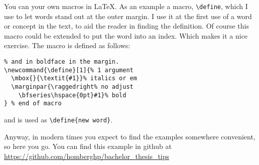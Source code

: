 You can  your own macros in \LaTeX. As an example a macro,
\verb#\define#, which I use
to let words stand out at the outer margin. I use it at the first use
of a word or concept in the text, to aid the reader in finding the
definition. Of course this macro could be extended to put the word
into an index. Which makes it a nice exercise.
\clearpage
The macro is defined as follows:
%
\begin{lstlisting}[caption={The macro is defined as follows},frame=shadowbox]
% This macro '\define' puts the argument in em 
% and in boldface in the margin.
\newcommand{\define}[1]{% 1 argument
  \mbox{}{\textit{#1}}% italics or em
  \marginpar{\raggedright% no adjust
    \bfseries\hspace{0pt}#1}% bold
} % end of macro

\end{lstlisting}

and is used as \verb#\define{new word}#.

Anyway, in modern times you expect to find the examples somewhere convenient, so here you go.
You can find this example in github at \url{https://github.com/homberghp/bachelor_thesis_tips}

